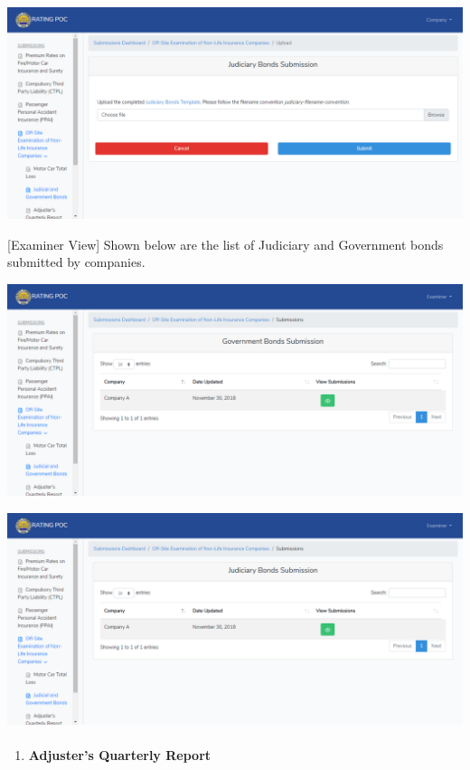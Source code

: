 \documentclass{article}
\begin{document}
\includegraphics[keepaspectratio=true]{up-ic-screens/image38}{}%

[Examiner View] Shown below are the list of Judiciary
and Government bonds submitted by companies.%

\includegraphics[keepaspectratio=true]{up-ic-screens/image110}{}%

\includegraphics[keepaspectratio=true]{up-ic-screens/image46}{}%

\begin{enumerate}[noitemsep,topsep=\mdcompacttopsep]%

\item{}
\paragraph{Adjuster’s Quarterly Report}\label{sec-adjusters-quarterly-report}%
\end{enumerate}%
\end{document}
